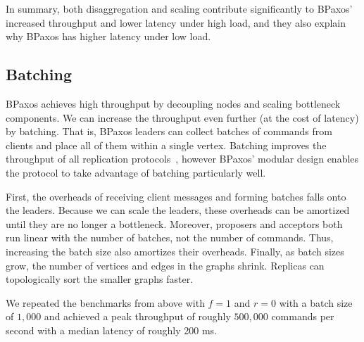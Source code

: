 In summary, both disaggregation and scaling contribute significantly to BPaxos'
increased throughput and lower latency under high load, and they also explain
why BPaxos has higher latency under low load.

%
%
\subsection{Batching}
BPaxos achieves high throughput by decoupling nodes and scaling bottleneck
components. We can increase the throughput even further (at the cost of
latency) by batching. That is, BPaxos leaders can collect batches of commands
from clients and place all of them within a single vertex. Batching improves
the throughput of all replication protocols~\cite{santos2012tuning,
santos2013optimizing, moraru2013proof}, however BPaxos' modular design enables
the protocol to take advantage of batching particularly well.

First, the overheads of receiving client messages and forming batches falls
onto the leaders. Because we can scale the leaders, these overheads can be
amortized until they are no longer a bottleneck. Moreover, proposers and
acceptors both run linear with the number of batches, not the number of
commands. Thus, increasing the batch size also amortizes their overheads.
Finally, as batch sizes grow, the number of vertices and edges in the graphs
shrink. Replicas can topologically sort the smaller graphs faster.

We repeated the benchmarks from above with $f=1$ and $r=0$ with a batch size of
$1,000$ and achieved a peak throughput of roughly $500,000$ commands per second
with a median latency of roughly 200 ms.
